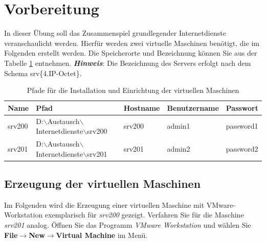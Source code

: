 \section{Vorbereitung}
In dieser Übung soll das Zusammenspiel grundlegender Internetdienste veranschaulicht werden.
Hierfür werden zwei virtuelle Maschinen benötigt, die im Folgenden erstellt
werden. Die Speicherorte und Bezeichnung können Sie aus der Tabelle
\ref{tab:install-location} entnehmen.
\newline
\newline
\textbf{\textit{Hinweis}}: Die Bezeichnung des Servers erfolgt nach dem
Schema srv\{4.IP-Octet\}.

\scriptsize
\begin{table}[!h]
  \centering
	\begin{tabular}{l l l l l}
		\hline
		Name & Pfad & Hostname & Benutzername & Passwort \\
		\hline
		srv200 & D:$\backslash$Austausch$\backslash$Internetdienste$\backslash$srv200 &
		srv200 & admin1 & password1 \\
		srv201 & D:$\backslash$Austausch$\backslash$Internetdienste$\backslash$srv201 &
		srv201 & admin2 & password2 \\
		\hline
	\end{tabular}
	\caption{Pfade für die Installation und Einrichtung der virtuellen Maschinen}
	\label{tab:install-location}
\end{table}
\normalsize 

\subsection{Erzeugung der virtuellen Maschinen}
Im Folgenden wird die Erzeugung einer virtuellen Maschine mit VMware-Workstation
exemplarisch für \textit{srv200} gezeigt. Verfahren Sie für die
Maschine \textit{srv201} analog. Öffnen Sie das Programm  \textit{VMware
Workstation} und wählen Sie \textbf{File$\rightarrow$New$\rightarrow$Virtual Machine} im Menü.

